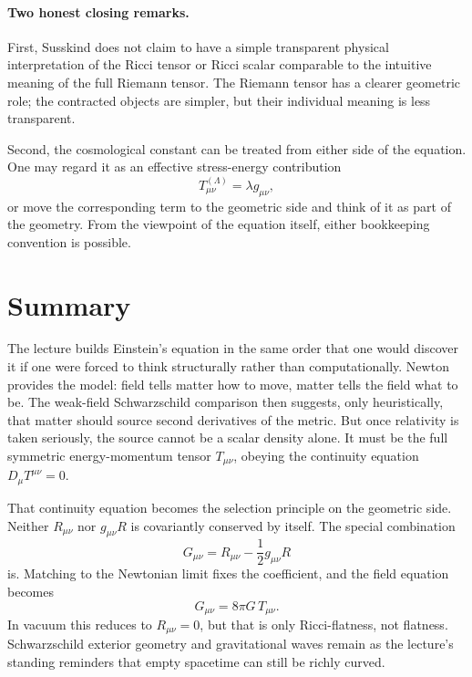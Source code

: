 \paragraph{Two honest closing remarks.} First, Susskind does not claim to have a simple transparent physical interpretation of the Ricci tensor or Ricci scalar comparable to the intuitive meaning of the full Riemann tensor. The Riemann tensor has a clearer geometric role; the contracted objects are simpler, but their individual meaning is less transparent.

Second, the cosmological constant can be treated from either side of the equation. One may regard it as an effective stress-energy contribution
\begin{equation}
T_{\mu\nu}^{(\Lambda)}=\lambda g_{\mu\nu},
\end{equation}
or move the corresponding term to the geometric side and think of it as part of the geometry. From the viewpoint of the equation itself, either bookkeeping convention is possible.

\section{Summary}

The lecture builds Einstein's equation in the same order that one would discover it if one were forced to think structurally rather than computationally. Newton provides the model: field tells matter how to move, matter tells the field what to be. The weak-field Schwarzschild comparison then suggests, only heuristically, that matter should source second derivatives of the metric. But once relativity is taken seriously, the source cannot be a scalar density alone. It must be the full symmetric energy-momentum tensor \(T_{\mu\nu}\), obeying the continuity equation \(D_\mu T^{\mu\nu}=0\).

That continuity equation becomes the selection principle on the geometric side. Neither \(R_{\mu\nu}\) nor \(g_{\mu\nu}R\) is covariantly conserved by itself. The special combination
\begin{equation}
G_{\mu\nu}=R_{\mu\nu}-\frac12 g_{\mu\nu}R
\end{equation}
is. Matching to the Newtonian limit fixes the coefficient, and the field equation becomes
\begin{equation}
G_{\mu\nu}=8\pi G\,T_{\mu\nu}.
\end{equation}
In vacuum this reduces to \(R_{\mu\nu}=0\), but that is only Ricci-flatness, not flatness. Schwarzschild exterior geometry and gravitational waves remain as the lecture's standing reminders that empty spacetime can still be richly curved.